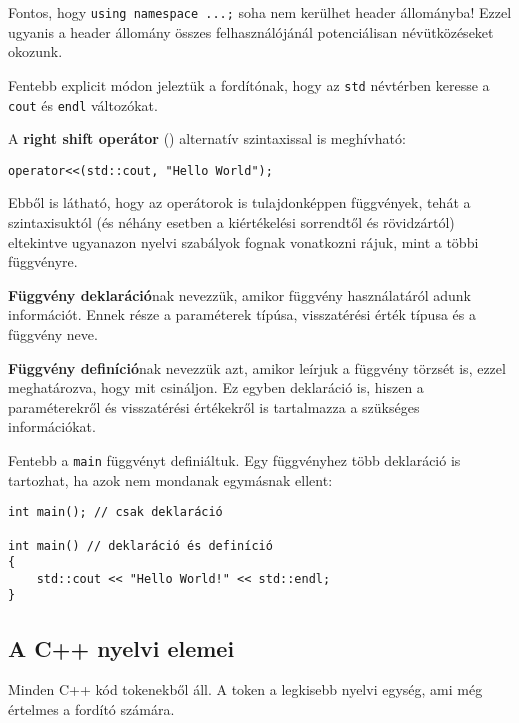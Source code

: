 \documentclass[../cpp_book/cpp_book.tex]{subfiles}
\begin{document}
	Fontos, hogy \texttt{using namespace ...;} soha nem kerülhet header állományba! Ezzel ugyanis a header állomány összes felhasználójánál potenciálisan névütközéseket okozunk.

	Fentebb explicit módon jeleztük a fordítónak, hogy az \texttt{std} névtérben keresse a \texttt{cout} és \texttt{endl} változókat.
	
	\medskip
	A \textbf{right shift operátor} (\texttt{\<}) alternatív szintaxissal is meghívható:
	\begin{lstlisting}
operator<<(std::cout, "Hello World");
	\end{lstlisting}
	Ebből is látható, hogy az operátorok is tulajdonképpen függvények, tehát a szintaxisuktól (és néhány esetben a kiértékelési sorrendtől és rövidzártól) eltekintve ugyanazon nyelvi szabályok fognak vonatkozni rájuk, mint a többi függvényre.
	
	\medskip
	\textbf{Függvény deklaráció}nak nevezzük, amikor függvény használatáról adunk információt. Ennek része a paraméterek típúsa, visszatérési érték típusa és a függvény neve.
	
	\medskip
	\textbf{Függvény definíció}nak nevezzük azt, amikor leírjuk a függvény törzsét is, ezzel meghatározva, hogy mit csináljon. Ez egyben deklaráció is, hiszen a paraméterekről és visszatérési értékekről is tartalmazza a szükséges információkat.
	
	\medskip
	Fentebb a \texttt{main} függvényt definiáltuk. Egy függvényhez több deklaráció is tartozhat, ha azok nem mondanak egymásnak ellent:
	\begin{lstlisting}
int main(); // csak deklaráció	

int main() // deklaráció és definíció
{
	std::cout << "Hello World!" << std::endl;
}
	\end{lstlisting}
	\subsection{A C++ nyelvi elemei}
	Minden C++ kód tokenekből áll. A token a legkisebb nyelvi egység, ami még értelmes a fordító számára. %
	
\end{document}
